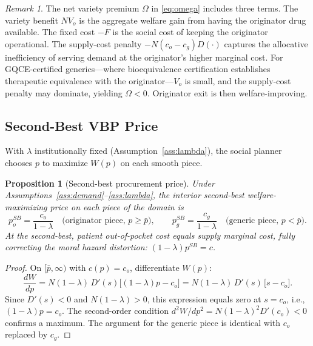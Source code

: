 \documentclass[12pt]{article}
\theoremstyle{plain}
\newtheorem{proposition}{Proposition}
\theoremstyle{definition}
\theoremstyle{remark}
\newtheorem{remark}{Remark}
\newcommand{\pbar}{\bar{p}}
\newcommand{\1}{\mathbf{1}}
\begin{document}
\begin{remark}
The net variety premium $\Omega$ in \eqref{eq:omega} includes three terms. The variety benefit $NV_o$ is the aggregate welfare gain from having the originator drug available. The fixed cost $-F$ is the social cost of keeping the originator operational. The supply-cost penalty $-N(c_o-c_g)D(\cdot)$ captures the allocative inefficiency of serving demand at the originator's higher marginal cost. For GQCE-certified generics---where bioequivalence certification establishes therapeutic equivalence with the originator---$V_o$ is small, and the supply-cost penalty may dominate, yielding $\Omega < 0$. Originator exit is then welfare-improving.
\end{remark}

\subsection{Second-Best VBP Price}

With $\lambda$ institutionally fixed (Assumption~\ref{ass:lambda}), the social planner chooses $p$ to maximize $W(p)$ on each smooth piece.

\begin{proposition}[Second-best procurement price]
\label{prop:secondbest}
Under Assumptions~\ref{ass:demand}--\ref{ass:lambda}, the interior second-best welfare-maximizing price on each piece of the domain is
\begin{equation}
p^{SB}_o = \frac{c_o}{1-\lambda} \quad \text{(originator piece, } p \geq \pbar\text{)}, \qquad p^{SB}_g = \frac{c_g}{1-\lambda} \quad \text{(generic piece, } p < \pbar\text{)}.
\label{eq:secondbest}
\end{equation}
At the second-best, patient out-of-pocket cost equals supply marginal cost, fully correcting the moral hazard distortion: $(1-\lambda)p^{SB} = c$.
\end{proposition}

\begin{proof}
On $[\pbar, \infty)$ with $c(p) = c_o$, differentiate $W(p)$:
$$\frac{dW}{dp} = N(1-\lambda)\,D'(s)\bigl[(1-\lambda)p - c_o\bigr] = N(1-\lambda)\,D'(s)\,\bigl[s - c_o\bigr].$$
Since $D'(s) < 0$ and $N(1-\lambda) > 0$, this expression equals zero at $s = c_o$, i.e., $(1-\lambda)p = c_o$. The second-order condition $d^2W/dp^2 = N(1-\lambda)^2 D'(c_o) < 0$ confirms a maximum. The argument for the generic piece is identical with $c_o$ replaced by $c_g$.
\end{proof}
\end{document}
